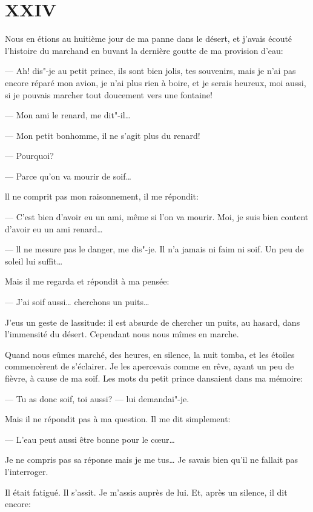 \section{XXIV}

Nous en étions au huitième jour de ma panne dans le désert, et j'avais écouté
l'histoire du marchand en buvant la dernière goutte de ma provision d'eau:

--- Ah! dis"-je au petit prince, ils sont bien jolis, tes souvenirs, mais je n'ai
pas encore réparé mon avion, je n'ai plus rien à boire, et je serais heureux, moi
aussi, si je pouvais marcher tout doucement vers une fontaine!

--- Mon ami le renard, me dit"-il\ldots{}

--- Mon petit bonhomme, il ne s'agit plus du renard!

--- Pourquoi?

--- Parce qu'on va mourir de soif\ldots{}

ll ne comprit pas mon raisonnement, il me répondit:

--- C'est bien d'avoir eu un ami, même si l'on va mourir. Moi, je suis bien content
d'avoir eu un ami renard\ldots{}

--- ll ne mesure pas le danger, me dis"-je. Il n'a jamais ni faim ni soif. Un peu
de soleil lui suffit\ldots{}

Mais il me regarda et répondit à ma pensée:

--- J'ai soif aussi\ldots{} cherchons un puits\ldots{}

J'eus un geste de lassitude: il est absurde de chercher un puits, au hasard, dans
l'immensité du désert. Cependant nous nous mîmes en marche.

\medskip

Quand nous eûmes marché, des heures, en silence, la nuit tomba, et les étoiles
commencèrent de s'éclairer. Je les apercevais comme en rêve, ayant un peu de fièvre,
à cause de ma soif. Les mots du petit prince dansaient dans ma mémoire:

--- Tu as donc soif, toi aussi? --- lui demandai"-je.

Mais il ne répondit pas à ma question. Il me dit simplement:

--- L'eau peut aussi être bonne pour le cœur\ldots{}

Je ne compris pas sa réponse mais je me tus\ldots{} Je savais bien qu'il ne fallait
pas l'interroger.

Il était fatigué. Il s'assit. Je m'assis auprès de lui. Et, après un silence, il dit
encore:

